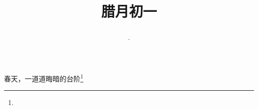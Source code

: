 \title{\date[d=11,m=1,y=2024][year:cn-y,年,month:cn,day:cn,日,·,weekday]·腊月初一 }
春天，一道道晦暗的台阶\footnote{ }

